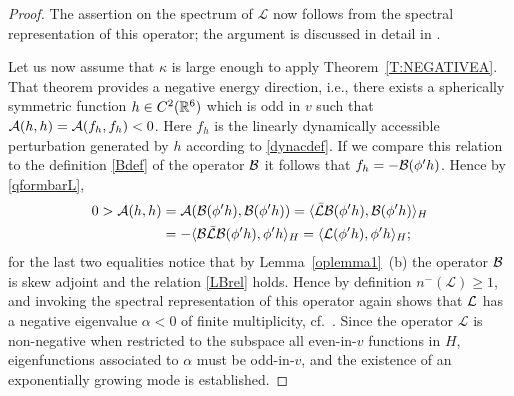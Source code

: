\documentclass[11pt]{article}
\begin{document}
\begin{proof}
  The assertion on the spectrum of $\mathcal L$ now
  follows from the spectral representation of this operator;
  the argument is discussed in detail in \cite[Prop.~A.2]{HaLinRe}.
  
  Let us now assume that $\kappa$ is large enough
  to apply Theorem~\ref{T:NEGATIVEA}. That theorem provides a negative
  energy direction, i.e., there exists a
  spherically symmetric function $h\in C^2(\mathbb R^6)$ which is odd in $v$
  such that ${\cal A}(h,h)={\cal A}(f_h,f_h)<0$. Here $f_h$ is the linearly dynamically
  accessible perturbation generated by $h$ according to \eqref{dynacdef}.
  If we compare this relation to the definition \eqref{Bdef}
  of the operator ${\cal B}$
  it follows that $f_h = -{\cal B} (\phi' h)$. Hence by \eqref{qformbarL},
  \begin{align*}
    0 > {\cal A}(h,h)
    &=
    {\cal A}({\cal B} (\phi' h),{\cal B} (\phi' h))
    =\langle \bar{{\cal L}} {\cal B}(\phi' h),{\cal B}(\phi' h)\rangle_H\\
    &=
    - \langle {\cal B} \bar{{\cal L}} {\cal B}(\phi' h),\phi' h\rangle_H
    =  \langle {\cal L} (\phi' h),\phi' h\rangle_H;
  \end{align*}
  for the last two equalities notice that by Lemma~\ref{oplemma1}~(b)
  the operator ${\cal B}$ is skew adjoint and the relation \eqref{LBrel} holds.
  Hence by definition
  $n^-(\mathcal L)\ge 1$, and invoking the spectral representation of
  this operator again shows that ${\cal L}$ has a negative eigenvalue
  $\alpha<0$ of finite multiplicity,
  cf.~\cite[Prop.~A.2]{HaLinRe}.
  Since the operator $\mathcal L$ is non-negative when
  restricted to the subspace all even-in-$v$ functions in $H$,
  eigenfunctions associated to $\alpha$ must be odd-in-$v$,
  and the existence of an exponentially growing mode is established. 
\end{proof}
\end{document}
